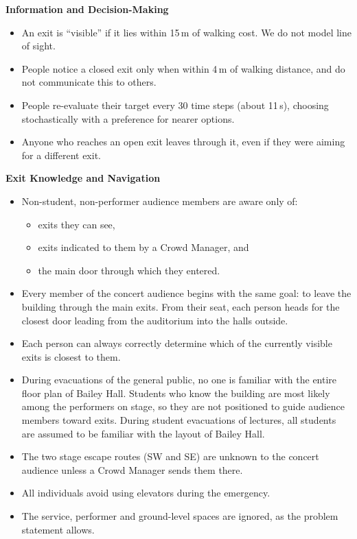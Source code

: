 \documentclass{article}
\begin{document}
\textbf{Information and Decision-Making}
\begin{itemize}
    \item An exit is ``visible'' if it lies within 15\,m of walking cost. We do not model line of sight.
    \item People notice a closed exit only when within 4\,m of walking distance, and do not communicate this to others.
    \item People re-evaluate their target every 30 time steps (about 11\,s), choosing stochastically with a preference for nearer options.
    \item Anyone who reaches an open exit leaves through it, even if they were aiming for a different exit.
\end{itemize}

\textbf{Exit Knowledge and Navigation}
\begin{itemize}
    \item Non-student, non-performer audience members are aware only of:
    \begin{itemize}
        \item exits they can see,
        \item exits indicated to them by a Crowd Manager, and
        \item the main door through which they entered.
    \end{itemize}
    \item Every member of the concert audience begins with the same goal: to leave the building through the main exits. From their seat, each person heads for the closest door leading from the auditorium into the halls outside.
    \item Each person can always correctly determine which of the currently visible exits is closest to them.
    \item During evacuations of the general public, no one is familiar with the entire floor plan of Bailey Hall. Students who know the building are most likely among the performers on stage, so they are not positioned to guide audience members toward exits. During student evacuations of lectures, all students are assumed to be familiar with the layout of Bailey Hall.
    \item The two stage escape routes (SW and SE) are unknown to the concert audience unless a Crowd Manager sends them there.
    \item All individuals avoid using elevators during the emergency.
    \item The service, performer and ground-level spaces are ignored, as the problem statement allows.
\end{itemize}
\end{document}

